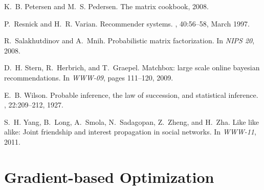 \documentclass{www2012-accepted}
\begin{document}
\begin{thebibliography}{10}
K.~B. Petersen and M.~S. Pedersen.
\newblock The matrix cookbook, 2008.

P.~Resnick and H.~R. Varian.
\newblock Recommender systems.
, 40:56--58, March 1997.

R.~Salakhutdinov and A.~Mnih.
\newblock Probabilistic matrix factorization.
\newblock In {\em {NIPS} 20}, 2008.

D.~H. Stern, R.~Herbrich, and T.~Graepel.
\newblock Matchbox: large scale online bayesian recommendations.
\newblock In {\em WWW-09}, pages 111--120, 2009.

E.~B. Wilson.
\newblock Probable inference, the law of succession, and statistical inference.
,
  22:209--212, 1927.

S.~H. Yang, B.~Long, A.~Smola, N.~Sadagopan, Z.~Zheng, and H.~Zha.
\newblock Like like alike: Joint friendship and interest propagation in social
  networks.
\newblock In {\em WWW-11}, 2011.

\end{thebibliography}


\appendix
\section{Gradient-based Optimization}
\label{app:Derivatives}

\end{document}
